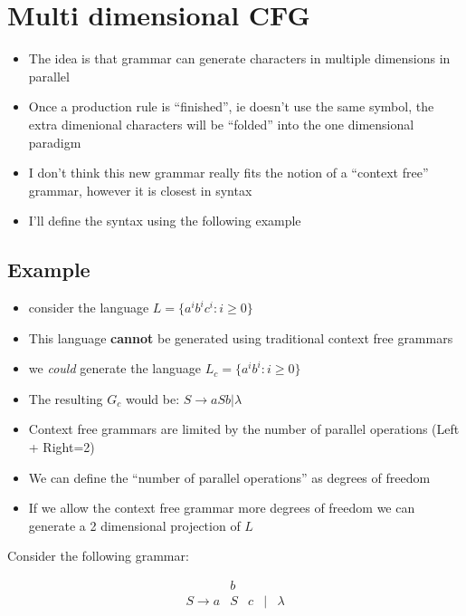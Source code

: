 \documentclass[11pt]{article}
\author{David Lewis}
\date{\today}
\title{}
\begin{document}
\section*{Multi dimensional CFG}
\label{sec:orgd42ca1f}
\begin{itemize}
\item The idea is that grammar can generate characters in multiple dimensions in parallel
\item Once a production rule is ``finished'', ie doesn't use the same symbol, the
extra dimenional characters will be ``folded'' into the one dimensional paradigm
\item I don't think this new grammar really fits the notion of a ``context free'' grammar,
however it is closest in syntax
\item I'll define the syntax using the following example
\end{itemize}
\subsection*{Example}
\label{sec:org20baae5}
\begin{itemize}
\item consider the language \(L = \{a^ib^ic^i: i \ge 0\}\)
\item This language \textbf{cannot} be generated using traditional context free grammars
\item we \emph{could} generate the language \(L_c = \{a^ib^i : i \ge 0\}\)
\item The resulting \(G_c\) would be: \(S \to aSb | \lambda\)
\item Context free grammars are limited by the number of parallel operations
(Left + Right=2)
\item We can define the ``number of parallel operations'' as degrees of freedom
\item If we allow the context free grammar more degrees of freedom we can generate a
2 dimensional projection of \(L\)
\end{itemize}

Consider the following grammar:
\setlength\arraycolsep{1pt}
\begin{tcolorbox}
\begin{equation}
\begin{matrix}&  b\\ S\to a & S & c & | & \lambda\end{matrix}
\end{equation}
\end{tcolorbox}
\end{document}

